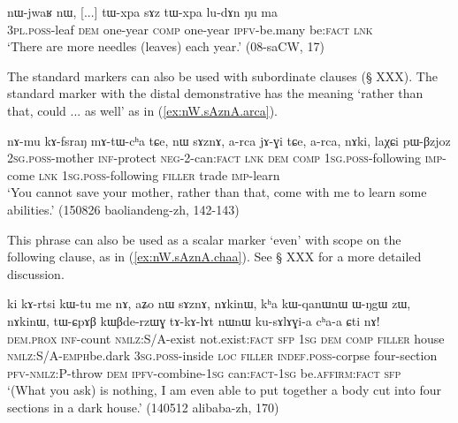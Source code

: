  \begin{exe}
 \ex \label{ex:tWxpa.sAz.tWxpa}
 \gll nɯ-jwaʁ nɯ, [...] tɯ-xpa sɤz tɯ-xpa lu-dɤn ŋu ma \\
 \textsc{3pl}.\textsc{poss}-leaf \textsc{dem} { } one-year \textsc{comp} one-year \textsc{ipfv}-be.many be:\textsc{fact} \textsc{lnk} \\
\glt  `There are more needles (leaves) each year.' (08-saCW, 17)
\end{exe}
 
 The standard markers can also be used with subordinate clauses (§ XXX). The standard marker with the distal demonstrative  has the meaning `rather than that, could ... as well' as in (\ref{ex:nW.sAznA.arca}).  
 
 \begin{exe}
 \ex \label{ex:nW.sAznA.arca}
 \gll  nɤ-mu kɤ-fsraŋ mɤ-tɯ-cʰa tɕe, nɯ sɤznɤ, a-rca jɤ-ɣi tɕe, a-rca, nɤki, laχɕi pɯ-βzjoz \\
 \textsc{2sg}.\textsc{poss}-mother \textsc{inf}-protect \textsc{neg}-2-can:\textsc{fact} \textsc{lnk} \textsc{dem} \textsc{comp} \textsc{1sg}.\textsc{poss}-following \textsc{imp}-come \textsc{lnk} \textsc{1sg}.\textsc{poss}-following \textsc{filler} trade \textsc{imp}-learn \\
\glt `You cannot save your mother, rather than that, come with me to learn  some abilities.' (150826 baoliandeng-zh, 142-143)
\end{exe}

This phrase can also be used as a scalar marker `even' with scope on the following clause, as in (\ref{ex:nW.sAznA.chaa}). See § XXX for a more detailed discussion. %
 

 \begin{exe}
 \ex \label{ex:nW.sAznA.chaa}
 \gll ki kɤ-rtsi kɯ-tu me nɤ, aʑo nɯ sɤznɤ, nɤkinɯ, kʰa kɯ-qanɯ\redp{}nɯ ɯ-ŋgɯ zɯ, nɤkinɯ, tɯ-ɕpɤβ kɯβde-rzɯɣ tɤ-kɤ-lɤt nɯnɯ ku-sɤlɤɣi-a cʰa-a ɕti nɤ! \\
 \textsc{dem}.\textsc{prox} \textsc{inf}-count \textsc{nmlz}:S/A-exist not.exist:\textsc{fact} \textsc{sfp} \textsc{1sg} \textsc{dem} \textsc{comp} \textsc{filler} house   \textsc{nmlz}:S/A-\textsc{emph}\redp{}be.dark \textsc{3sg}.\textsc{poss}-inside \textsc{loc}  \textsc{filler} \textsc{indef}.\textsc{poss}-corpse four-section \textsc{pfv}-\textsc{nmlz}:P-throw \textsc{dem} \textsc{ipfv}-combine-\textsc{1sg} can:\textsc{fact}-\textsc{1sg} be.\textsc{affirm}:\textsc{fact} \textsc{sfp}  \\
\glt  `(What you ask) is nothing, I am even able to put together a body cut into four sections in a dark house.' (140512 alibaba-zh, 170)
\end{exe}

